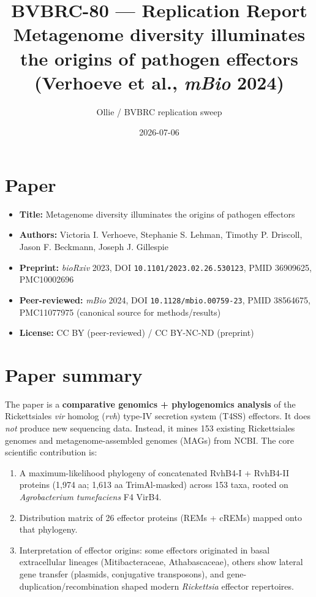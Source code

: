 \documentclass[11pt,letterpaper]{article}
\title{BVBRC-80 --- Replication Report\\
\large Metagenome diversity illuminates the origins of pathogen effectors\\
(Verhoeve et al., \emph{mBio} 2024)}
\author{Ollie / BVBRC replication sweep}
\date{2026-07-06}
\begin{document}
\maketitle

\section{Paper}

\begin{itemize}[leftmargin=1.4em]
  \item \textbf{Title:} Metagenome diversity illuminates the origins of pathogen effectors
  \item \textbf{Authors:} Victoria I. Verhoeve, Stephanie S. Lehman, Timothy P. Driscoll, Jason F. Beckmann, Joseph J. Gillespie
  \item \textbf{Preprint:} \emph{bioRxiv} 2023, DOI \texttt{10.1101/2023.02.26.530123}, PMID 36909625, PMC10002696
  \item \textbf{Peer-reviewed:} \emph{mBio} 2024, DOI \texttt{10.1128/mbio.00759-23}, PMID 38564675, PMC11077975 (canonical source for methods/results)
  \item \textbf{License:} CC BY (peer-reviewed) / CC BY-NC-ND (preprint)
\end{itemize}

\section{Paper summary}

The paper is a \textbf{comparative genomics + phylogenomics analysis} of the Rickettsiales
\emph{vir} homolog (\emph{rvh}) type-IV secretion system (T4SS) effectors. It does \emph{not}
produce new sequencing data. Instead, it mines 153 existing Rickettsiales genomes and
metagenome-assembled genomes (MAGs) from NCBI. The core scientific contribution is:

\begin{enumerate}[leftmargin=1.6em]
  \item A maximum-likelihood phylogeny of concatenated RvhB4-I + RvhB4-II proteins
    (1,974 aa; 1,613 aa TrimAl-masked) across 153 taxa, rooted on
    \emph{Agrobacterium tumefaciens} F4 VirB4.
  \item Distribution matrix of 26 effector proteins (REMs + cREMs) mapped onto that phylogeny.
  \item Interpretation of effector origins: some effectors originated in basal extracellular
    lineages (Mitibacteraceae, Athabascaceae), others show lateral gene transfer (plasmids,
    conjugative transposons), and gene-duplication/recombination shaped modern
    \emph{Rickettsia} effector repertoires.
\end{enumerate}
\end{document}
